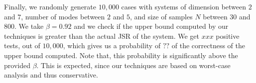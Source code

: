 Finally, we randomly generate $10,000$ cases with systems of dimension between $2$ and $7$, number of modes between $2$ and $5$, and size of samples $N$ between $30$ and $800$. We take $\beta = 0.92$ and we check if the upper bound computed by our techniques is greater than the actual JSR of the system. We get $xxx$ positive tests, out of $10,000$, which gives us a probability of $??$ of the correctness of the upper bound computed. Note that, this probability is significantly above the provided $\beta$. This is expected, since our techniques are based on worst-case analysis and thus conservative.



